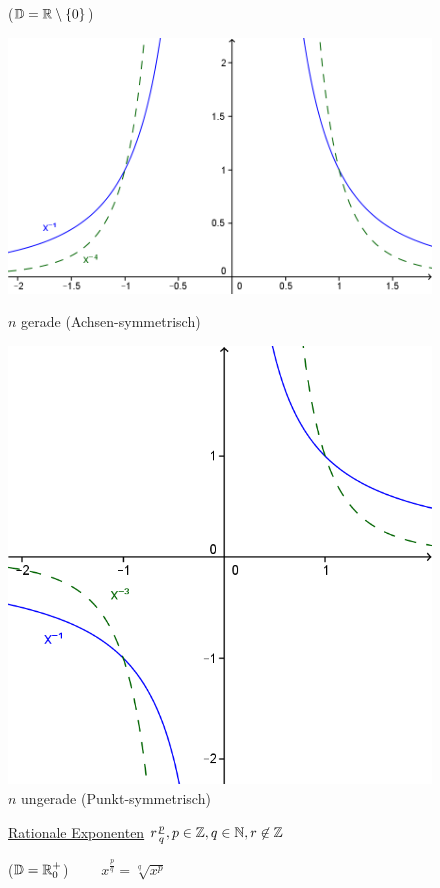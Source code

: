\begin{enumerate}[A)]
	\begin{figure}[h!]
		 ($\mathbb{D}=\mathbb{R}\setminus\{0\}$)
		
		\begin{minipage}{0.49\linewidth}
			\centering \includegraphics[width=0.9\linewidth]{Bilder/161}
			\caption{$n$ gerade (Achsen-symmetrisch)}
		\end{minipage}
		\begin{minipage}{0.49\linewidth}
			\centering \includegraphics[width=0.7\linewidth]{Bilder/162}
			\caption{$n$ ungerade (Punkt-symmetrisch)}
		\end{minipage}
	\end{figure}
	
	\begin{figure}[h!]
		\item \ul{Rationale Exponenten} $r\frac{p}{q}, p\in\mathbb{Z},q\in\mathbb{N},r\not\in\mathbb{Z}$
		
		\begin{minipage}{0.49\linewidth}
			 ($\mathbb{D}=\mathbb{R}_0^+$) $\qquad x^\frac{p}{q}=\sqrt[q]{x^p}$
			

\end{minipage}
\end{figure}
\end{enumerate}
